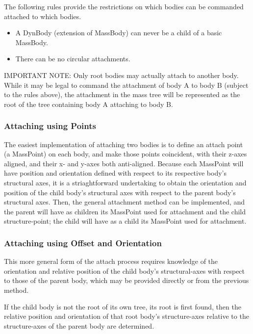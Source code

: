 The following rules provide the restrictions on which bodies can be commanded 
attached to which bodies.
\begin{itemize}
 \item A DynBody (extension of MassBody) can never be a child of a basic 
 MassBody.
 \item There can be no circular attachments.
\end{itemize}
IMPORTANT NOTE: Only root bodies may actually attach to another body.  While 
it may be legal to command the attachment of body A to body B (subject to the 
rules above), the attachment in the mass tree will be represented as the root 
of the tree containing body A attaching to body B.

\subsubsection{Attaching using Points}
The easiest implementation of attaching two bodies is to define an attach 
point (a MassPoint) on each body, and make those points coincident, with their 
z-axes aligned, and their x- and y-axes both anti-aligned.  Because each 
MassPoint will have position and orientation defined with respect to its 
respective body's structural axes, it is a striaghtforward undertaking to 
obtain the orientation and position of the child body's structural axes with 
respect to the parent body's structural axes.  Then, the general attachment 
method can be implemented, and the parent will have as children its MassPoint 
used for attachment and the child structure-point; the child will have as a 
child its MassPoint used for attachment.

\subsubsection{Attaching using Offset and Orientation}
This more general form of the attach process requires knowledge of the 
orientation and relative position of the child body's structural-axes with 
respect to those of the parent body, which may be provided directly or from 
the previous method.  

If the child body is not the root of its own tree, its root is first found, 
then the relative position and orientation of that root body's structure-axes 
relative to the structure-axes of the parent body are determined.

